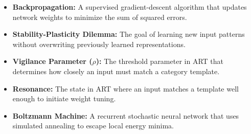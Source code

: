 \documentclass[12pt,a4paper]{article}
\begin{document}
\begin{tcolorbox}[defbox, title={\textbf{One-Line Definitions}}]
\begin{itemize}[leftmargin=*, itemsep=2.5pt, topsep=0pt]
  \item \textbf{Backpropagation:} A supervised gradient-descent algorithm that updates network weights to minimize the sum of squared errors.
  \item \textbf{Stability-Plasticity Dilemma:} The goal of learning new input patterns without overwriting previously learned representations.
  \item \textbf{Vigilance Parameter ($\rho$):} The threshold parameter in ART that determines how closely an input must match a category template.
  \item \textbf{Resonance:} The state in ART where an input matches a template well enough to initiate weight tuning.
  \item \textbf{Boltzmann Machine:} A recurrent stochastic neural network that uses simulated annealing to escape local energy minima.
\end{itemize}
\end{tcolorbox}
\end{document}

